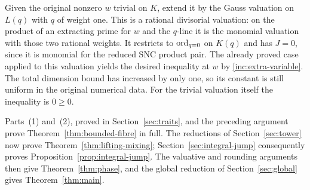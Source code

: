 Given the original nonzero $w$ trivial on $K$, extend it by the
Gauss valuation on $L(q)$ with $q$ of weight one.  This is a rational
divisorial valuation: on the product of an extracting prime for
$w$ and the $q$-line it is the monomial valuation with those two
rational weights.  It restricts to $\operatorname{ord}_{q=0}$ on $K(q)$ and has
$J=0$, since it is monomial for the reduced SNC product pair.
The already proved case applied to this valuation yields the
desired inequality at $w$ by \eqref{inc:extra-variable}.  The total
dimension bound has increased by only one, so its constant is still
uniform in the original numerical data.  For the trivial valuation
itself the inequality is $0\geq0$.

Parts~(1) and~(2), proved in Section~\ref{sec:traits}, and the
preceding argument prove
Theorem~\ref{thm:bounded-fibre} in full.  The reductions of
Section~\ref{sec:tower} now prove Theorem~\ref{thm:lifting-mixing};
Section~\ref{sec:integral-jump} consequently proves
Proposition~\ref{prop:integral-jump}.  The valuative and rounding
arguments then give Theorem~\ref{thm:phase}, and the global reduction
of Section~\ref{sec:global} gives Theorem~\ref{thm:main}.
